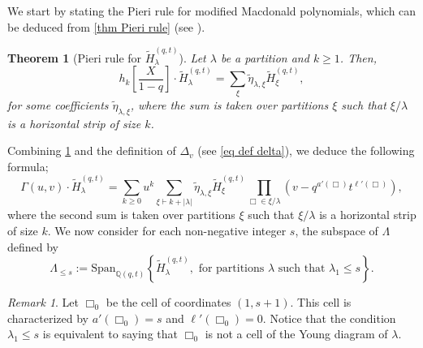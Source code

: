 \documentclass[12pt]{amsart}
\newtheorem{thm}{Theorem}[section]
\theoremstyle{remark}
\newtheorem{rmq}{Remark}
\newcommand{\tH}{\widetilde{H}^{(q,t)}}
\begin{document}
We start by stating the Pieri rule for modified Macdonald polynomials, which can be deduced from \cref{thm Pieri rule} (see \cite[Proposition~2.7]{GarsiaTeslerAdvances96}). 
\begin{thm}[Pieri rule for $\tH_\lambda$]\label{thm Pieri rule modified}
Let $\lambda$ be a partition and $k\geq 1$. Then, 
$$h_k\left[\frac{X}{1-q}\right]\cdot \tH_\lambda=\sum_{\xi}\widetilde \eta_{\lambda,\xi} \tH_\xi,$$
for some coefficients $\widetilde\eta_{\lambda,\xi}$,  where the sum is taken over partitions $\xi$ such that $\xi/ \lambda$ is a horizontal strip of size $k$.
\end{thm}

Combining \cref{thm Pieri rule modified} and the definition of $\Delta_v$ (see \cref{eq def delta}), we deduce the following formula;   
\begin{equation}\label{eq Gamma formula}
  \Gamma(u,v)\cdot \tH_\lambda=\sum_{k\geq 0}u^k\sum_{\xi\vdash k+|\lambda|}\widetilde\eta_{\lambda,\xi}\tH_\xi\prod_{\Box\in\xi/ \lambda}\left(v-q^{a'(\Box)}t^{\ell'(\Box)}\right),  
\end{equation}
where the second sum is taken over partitions $\xi$ such that $\xi/\lambda$ is a horizontal strip of size $k$. We now consider for each non-negative integer $s$, the subspace of $\Lambda$ defined by 
$$\Lambda_{\leq s}:=\text{Span}_{\mathbb Q(q,t)}\left\{\tH_\lambda, \text{ for partitions }\lambda \text{ such that }\lambda_1\leq s\right\}.$$

\begin{rmq}\label{rmq Box0}
    Let $\Box_0$ be the cell of coordinates $(1,s+1)$. This cell is characterized by $a'(\Box_0)=s$ and $\ell'(\Box_0)=0$. Notice that the condition $\lambda_1\leq s$ is equivalent to saying that $\Box_0$ is not a cell of the Young diagram of $\lambda$.
\end{rmq}
\end{document}
